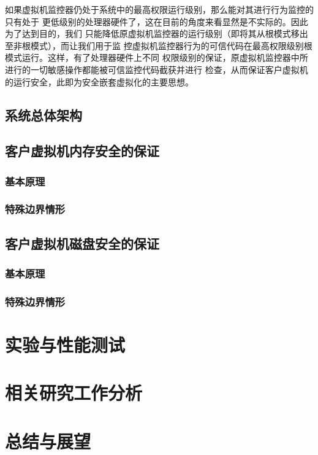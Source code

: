 如果虚拟机监控器仍处于系统中的最高权限运行级别，那么能对其进行行为监控的只有处于
更低级别的处理器硬件了，这在目前的角度来看显然是不实际的。因此为了达到目的，我们
只能降低原虚拟机监控器的运行级别（即将其从根模式移出至非根模式），而让我们用于监
控虚拟机监控器行为的可信代码在最高权限级别根模式运行。这样，有了处理器硬件上不同
权限级别的保证，原虚拟机监控器中所进行的一切敏感操作都能被可信监控代码截获并进行
检查，从而保证客户虚拟机的运行安全，此即为安全嵌套虚拟化的主要思想。

\subsection{系统总体架构}

\subsection{客户虚拟机内存安全的保证}

\subsubsection{基本原理}

\subsubsection{特殊边界情形}

\subsection{客户虚拟机磁盘安全的保证}

\subsubsection{基本原理}

\subsubsection{特殊边界情形}



\section{实验与性能测试}



\section{相关研究工作分析}



\section{总结与展望}
